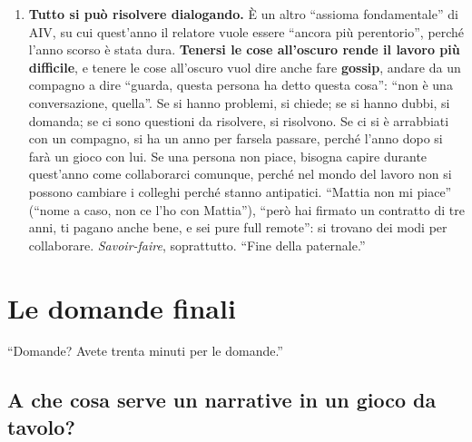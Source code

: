 \begin{enumerate}
        implicita con il pubblico, che comincia a chiedersi dove verrà usato.
        Come la mitragliatrice di \emph{Breaking Bad}: Vince Gilligan, che ha
        scritto la serie, non sapeva nemmeno come usarla; l'ha messa ``nel
        pilot'' e poi pensava che il pubblico se ne sarebbe dimenticato, ma
        gli sceneggiatori della writers' room gli hanno detto che il pubblico
        se ne sarebbe ricordato; e infatti poi ne hanno fatto il
        \emph{payoff}\footnote{La mitragliatrice M60 compare non nel pilot ma
        nel \emph{flash-forward} iniziale della quinta stagione (2012), e
        viene usata nell'episodio finale della serie. Sull'aneddoto della
        writers' room il capitolo riporta la versione del relatore.}.
  \item \textbf{Tutto si può risolvere dialogando.} È un altro ``assioma
        fondamentale'' di AIV, su cui quest'anno il relatore vuole essere
        ``ancora più perentorio'', perché l'anno scorso è stata dura.
        \textbf{Tenersi le cose all'oscuro rende il lavoro più difficile}, e
        tenere le cose all'oscuro vuol dire anche fare \textbf{gossip}, andare
        da un compagno a dire ``guarda, questa persona ha detto questa cosa'':
        ``non è una conversazione, quella''. Se si hanno problemi, si chiede;
        se si hanno dubbi, si domanda; se ci sono questioni da risolvere, si
        risolvono. Se ci si è arrabbiati con un compagno, si ha un anno per
        farsela passare, perché l'anno dopo si farà un gioco con lui. Se una
        persona non piace, bisogna capire durante quest'anno come
        collaborarci comunque, perché nel mondo del lavoro non si possono
        cambiare i colleghi perché stanno antipatici. ``Mattia non mi piace''
        (``nome a caso, non ce l'ho con Mattia''), ``però hai firmato un
        contratto di tre anni, ti pagano anche bene, e sei pure full remote'':
        si trovano dei modi per collaborare. \emph{Savoir-faire}, soprattutto.
        ``Fine della paternale.''
\end{enumerate}

\section{Le domande finali}
\label{p3:sec:domande}

``Domande? Avete trenta minuti per le domande.''

\subsection{A che cosa serve un narrative in un gioco da tavolo?}

